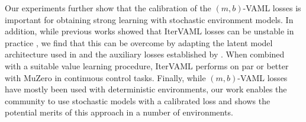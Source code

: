 Our experiments further show that the calibration of the $(m,b)$-VAML losses is important for obtaining strong learning with stochastic environment models.
In addition, while previous works showed that IterVAML losses can be unstable in practice \parencite{lovatto2020decision,voelcker2022value}, we find that this can be overcome by adapting the latent model architecture used in \textcite{schrittwieser2020mastering} and the auxiliary losses established by \textcite{li2023efficient,hansen2022temporal}.
When combined with a suitable value learning procedure, IterVAML performs on par or better with MuZero in continuous control tasks.
Finally, while $(m,b)$-VAML losses have mostly been used with deterministic environments, our work enables the community to use stochastic models with a calibrated loss and shows the potential merits of this approach in a number of environments.

